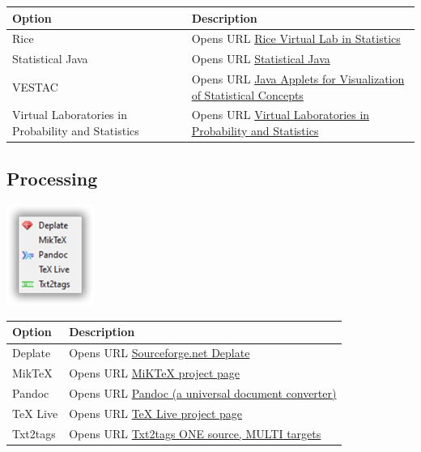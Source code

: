 \begin{scriptsize}
\begin{tabularx}{\textwidth}{>{\hsize=0.3\hsize}X>{\hsize=0.7\hsize}X}\\
    \hline
    \textbf{Option} & \textbf{Description} \\
    \hline
    Rice & Opens URL \href{http://onlinestatbook.com/rvls.html}{Rice Virtual Lab in Statistics} \\
    Statistical Java & Opens URL \href{http://www.causeweb.org/repository/statjava/}{Statistical Java} \\
    VESTAC & Opens URL \href{http://lstat.kuleuven.be/newjava/vestac/}{Java Applets for Visualization of Statistical Concepts} \\
    Virtual Laboratories in Probability and Statistics & Opens URL \href{http://www.math.uah.edu/stat/}{Virtual Laboratories in Probability and Statistics} \\
    \hline
  \end{tabularx}
\end{scriptsize}


\newpage
\hypertarget{menu_web_processing}{}
\subsection{Processing}

\includegraphics[scale=0.50]{./res/menu_web_processing.png}\\

\begin{scriptsize}
  \begin{tabularx}{\textwidth}{>{\hsize=0.3\hsize}X>{\hsize=0.7\hsize}X}\\
    \hline
    \textbf{Option} & \textbf{Description} \\
    \hline
    Deplate & Opens URL \href{http://deplate.sourceforge.net/index.php}{Sourceforge.net Deplate} \\
    MikTeX & Opens URL \href{http://miktex.org/}{MiKTeX project page} \\
    Pandoc & Opens URL \href{http://johnmacfarlane.net/pandoc/}{Pandoc (a universal document converter)} \\
    TeX Live & Opens URL \href{https://tug.org/texlive/}{TeX Live project page} \\
    Txt2tags & Opens URL \href{http://txt2tags.sourceforge.net/}{Txt2tags ONE source, MULTI targets} \\
    \hline
  \end{tabularx}
\end{scriptsize}
